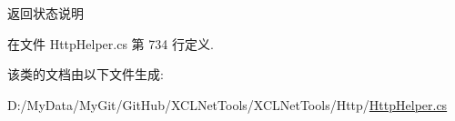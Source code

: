 返回状态说明 



在文件 Http\-Helper.\-cs 第 734 行定义.



该类的文档由以下文件生成\-:\begin{DoxyCompactItemize}
\item 
D\-:/\-My\-Data/\-My\-Git/\-Git\-Hub/\-X\-C\-L\-Net\-Tools/\-X\-C\-L\-Net\-Tools/\-Http/\hyperlink{_http_helper_8cs}{Http\-Helper.\-cs}\end{DoxyCompactItemize}
